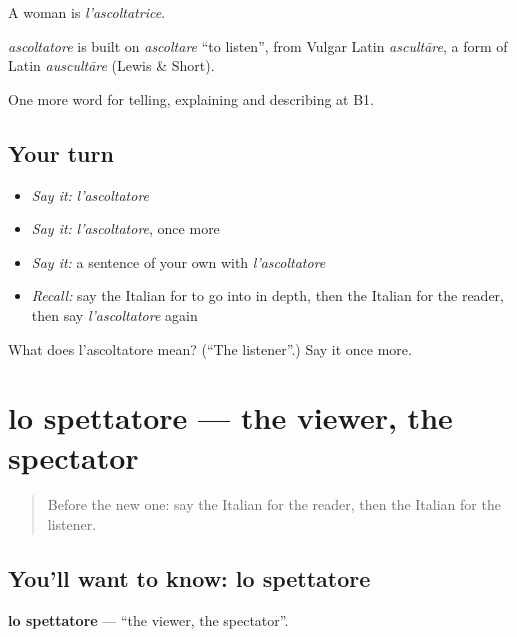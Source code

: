 A woman is \emph{l'ascoltatrice}.

\begin{cousinweb}
\emph{ascoltatore} is built on \emph{ascoltare} \textquotedblleft{}to listen\textquotedblright{}, from Vulgar Latin \emph{ascultāre}, a form of Latin \emph{auscultāre} (Lewis \& Short).
\end{cousinweb}

\begin{grammarlens}[title={What you've built}]
One more word for telling, explaining and describing at B1.
\end{grammarlens}

\subsection*{Your turn}
\begin{itemize}
\raggedright
  \item \emph{Say it:} \emph{l'ascoltatore}
  \item \emph{Say it:} \emph{l'ascoltatore}, once more
  \item \emph{Say it:} a sentence of your own with \emph{l'ascoltatore}
  \item \emph{Recall:} say the Italian for to go into in depth, then the Italian for the reader, then say \emph{l'ascoltatore} again
\end{itemize}

\begin{tcolorbox}[breakable,colback=teal!4,colframe=teal!35!black,title={Before you move on}]
What does l'ascoltatore mean? (\textquotedblleft{}The listener\textquotedblright{}.) Say it once more.
\end{tcolorbox}
\section[lo spettatore]{lo spettatore — the viewer, the spectator}

\label{lesson:IT-C289-spettatore}



\begin{quote}
Before the new one: say the Italian for the reader, then the Italian for the listener.
\end{quote}

\subsection*{You'll want to know: lo spettatore}
\textbf{lo spettatore} — \textquotedblleft{}the viewer, the spectator\textquotedblright{}.

